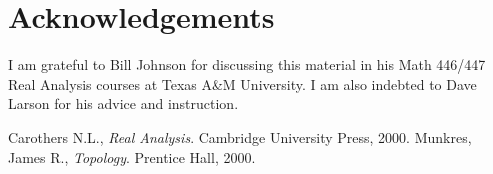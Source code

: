 \documentclass{article}
\newtheorem{corollary}{Corollary}
\newcommand{\R}{\mathbb{R}}
\newcommand{\m}{m^*_\alpha}
\begin{document}
\begin{comment}
\begin{corollary}
Let $f:\R\rightarrow\R$, and $D(f)$ denote the set of discontinuities of $f$. If $\m(D(f)) = 0$ for all nondecreasing, continous $\alpha:\mathbb{R} \rightarrow \mathbb{R}$, then $D(f)$ is countable.
\end{corollary}
\end{comment}

\section*{Acknowledgements}
I am grateful to Bill Johnson for discussing this material in his Math 446/447 Real Analysis courses at Texas A\&M University.  I am also indebted to Dave Larson for his advice and instruction.

\begin{thebibliography}{81}
 Carothers N.L., {\it Real Analysis}. Cambridge University
Press, 2000. 
 Munkres, James R., {\it Topology}. Prentice Hall, 2000. 
\end{thebibliography}
\end{document}

